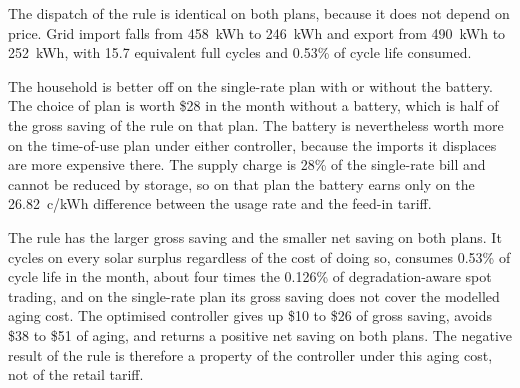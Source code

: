 The dispatch of the rule is identical on both plans, because it does not depend on
price. Grid import falls from 458~kWh to 246~kWh and export from 490~kWh to 252~kWh,
with 15.7 equivalent full cycles and 0.53\% of cycle life consumed.

The household is better off on the single-rate plan with or without the battery. The
choice of plan is worth \$28 in the month without a battery, which is half of the gross
saving of the rule on that plan. The battery is nevertheless worth more on the
time-of-use plan under either controller, because the imports it displaces are more
expensive there. The supply charge is 28\% of the single-rate bill and cannot be reduced
by storage, so on that plan the battery earns only on the 26.82~c/kWh difference between
the usage rate and the feed-in tariff.

The rule has the larger gross saving and the smaller net saving on both plans. It cycles
on every solar surplus regardless of the cost of doing so, consumes 0.53\% of cycle life
in the month, about four times the 0.126\% of degradation-aware spot trading, and on the
single-rate plan its gross saving does not cover the modelled aging cost. The optimised
controller gives up \$10 to \$26 of gross saving, avoids \$38 to \$51 of aging, and
returns a positive net saving on both plans. The negative result of the rule is therefore
a property of the controller under this aging cost, not of the retail tariff.



